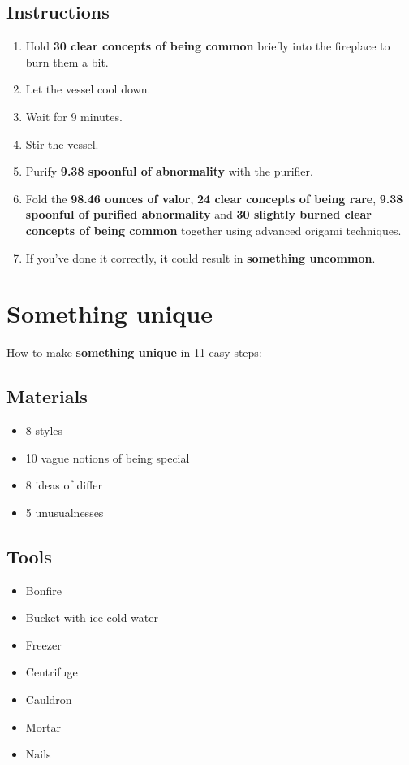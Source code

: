 \documentclass{article}
\begin{document}
\subsection{Instructions}\begin{enumerate}
\item 
Hold \textbf{30 clear concepts of being common} briefly into the fireplace to burn them a bit.
\item 
Let the vessel cool down.
\item 
Wait for 9 minutes.
\item 
Stir the vessel.
\item 
Purify \textbf{9.38 spoonful of abnormality} with the purifier.
\item 
Fold the \textbf{98.46 ounces of valor}, \textbf{24 clear concepts of being rare}, \textbf{9.38 spoonful of purified abnormality} and \textbf{30 slightly burned clear concepts of being common} together using advanced origami techniques.
\item 
If you've done it correctly, it could result in \textbf{something uncommon}.
\end{enumerate}
\newpage
\section{Something unique}How to make \textbf{something unique} in 11 easy steps:

\subsection{Materials}\begin{itemize}
\item 
8 styles
\item 
10 vague notions of being special
\item 
8 ideas of differ
\item 
5 unusualnesses
\end{itemize}
\subsection{Tools}\begin{itemize}
\item 
Bonfire
\item 
Bucket with ice-cold water
\item 
Freezer
\item 
Centrifuge
\item 
Cauldron
\item 
Mortar
\item 
Nails
\end{itemize}
\end{document}
